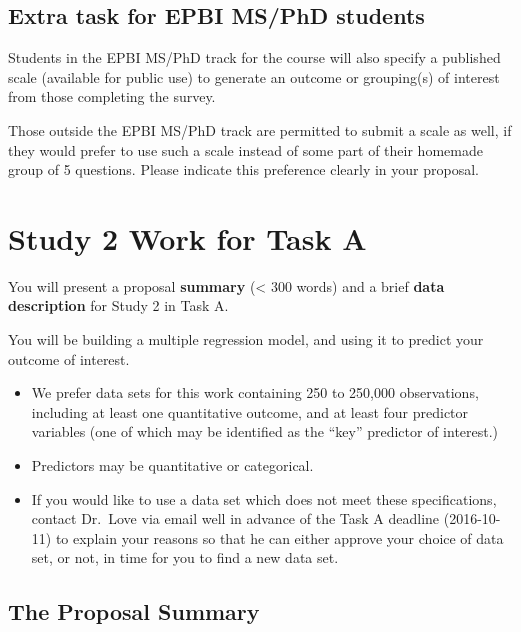 \documentclass[]{book}
\providecommand{\tightlist}{%
  \setlength{\itemsep}{0pt}\setlength{\parskip}{0pt}}
\theoremstyle{definition}
\theoremstyle{definition}
\theoremstyle{definition}
\theoremstyle{remark}
\begin{document}
\hypertarget{extra-task-for-epbi-msphd-students}{%
\subsection{Extra task for EPBI MS/PhD
students}\label{extra-task-for-epbi-msphd-students}}

Students in the EPBI MS/PhD track for the course will also specify a
published scale (available for public use) to generate an outcome or
grouping(s) of interest from those completing the survey.

Those outside the EPBI MS/PhD track are permitted to submit a scale as
well, if they would prefer to use such a scale instead of some part of
their homemade group of 5 questions. Please indicate this preference
clearly in your proposal.

\hypertarget{study-2-work-for-task-a}{%
\section{Study 2 Work for Task A}\label{study-2-work-for-task-a}}

You will present a proposal \textbf{summary} (\textless{} 300 words) and
a brief \textbf{data description} for Study 2 in Task A.

You will be building a multiple regression model, and using it to
predict your outcome of interest.

\begin{itemize}
\tightlist
\item
  We prefer data sets for this work containing 250 to 250,000
  observations, including at least one quantitative outcome, and at
  least four predictor variables (one of which may be identified as the
  ``key'' predictor of interest.)
\item
  Predictors may be quantitative or categorical.
\item
  If you would like to use a data set which does not meet these
  specifications, contact Dr.~Love via email well in advance of the Task
  A deadline (2016-10-11) to explain your reasons so that he can either
  approve your choice of data set, or not, in time for you to find a new
  data set.
\end{itemize}

\hypertarget{the-proposal-summary}{%
\subsection{The Proposal Summary}\label{the-proposal-summary}}
\end{document}
